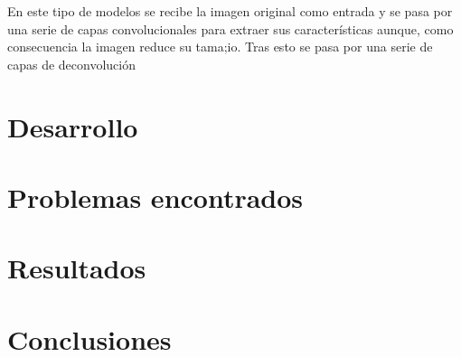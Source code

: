 \documentclass[a4paper]{article}
\begin{document}
En este tipo de modelos se recibe la imagen original como entrada y se pasa por una serie de capas convolucionales para extraer sus características aunque, como consecuencia la imagen reduce su tama;io.
Tras esto se pasa por una serie de capas de deconvolución 

\section{Desarrollo}

\section{Problemas encontrados}

\section{Resultados}

\section{Conclusiones}

\newpage
\printbibliography
\end{document}

